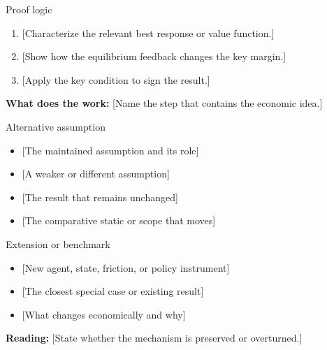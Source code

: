 \documentclass[11pt, aspectratio=169]{beamer}
\begin{document}
\AppendixStart


\begin{frame}{Proof logic}
  \hypertarget{app:proof}{}%
  \medskip
  \begin{enumerate}\setlength{\itemsep}{0.7em}
    \item {[Characterize the relevant best response or value function.]}
    \item {[Show how the equilibrium feedback changes the key margin.]}
    \item {[Apply the key condition to sign the result.]}
  \end{enumerate}

  \bigskip
  \textbf{What does the work:} [Name the step that contains the economic idea.]
\end{frame}

\begin{frame}{Alternative assumption}
  \hypertarget{app:assumption}{}%
  \medskip
  \begin{itemize}\setlength{\itemsep}{0.68em}
    \item {} [The maintained assumption and its role]
    \item {} [A weaker or different assumption]
    \item {} [The result that remains unchanged]
    \item {} [The comparative static or scope that moves]
  \end{itemize}
\end{frame}

\begin{frame}{Extension or benchmark}
  \hypertarget{app:extension}{}%
  \medskip
  \begin{itemize}\setlength{\itemsep}{0.72em}
    \item {} [New agent, state, friction, or policy instrument]
    \item {} [The closest special case or existing result]
    \item {} [What changes economically and why]
  \end{itemize}

  \bigskip
  \textbf{Reading:} [State whether the mechanism is preserved or overturned.]
\end{frame}
\end{document}
